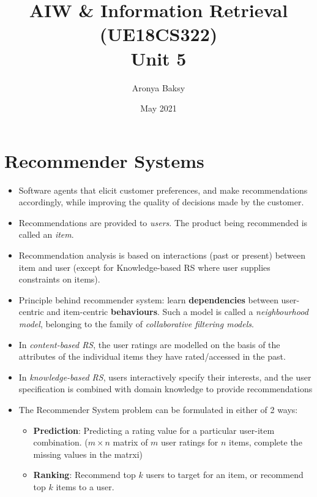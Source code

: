 \documentclass{article}
\title{AIW \& Information Retrieval (UE18CS322)\\Unit 5}
\author{Aronya Baksy}
\date{May 2021}
\begin{document}
\maketitle
\section{Recommender Systems}
\begin{itemize}
    \item Software agents that elicit customer preferences, and make recommendations accordingly, while improving the quality of decisions made by the customer. 
    
    \item Recommendations are provided to \textit{users}. The product being recommended is called an \textit{item}. 
    
    \item Recommendation analysis is based on interactions (past or present) between item and user (except for Knowledge-based RS where user supplies constraints on items).
    
    \item Principle behind recommender system: learn \textbf{dependencies} between user-centric and item-centric \textbf{behaviours}. Such a model is called a \textit{neighbourhood model}, belonging to the family of \textit{collaborative filtering models}.
    
    \item In \textit{content-based RS}, the user ratings are modelled on the basis of the attributes of the individual items they have rated/accessed in the past. 
    
    \item In \textit{knowledge-based RS}, users interactively specify their interests, and the user specification is combined with domain knowledge to provide recommendations
    
    \item The Recommender System problem can be formulated in either of 2 ways:
    \begin{itemize}
        \item \textbf{Prediction}: Predicting a rating value for a particular user-item combination. ($m\times n$ matrix of $m$ user ratings for $n$ items, complete the missing values in the matrxi)
        
        \item \textbf{Ranking}: Recommend top $k$ users to target for an item, or recommend top $k$ items to a user. 
    \end{itemize}
\end{itemize}
\end{document}
